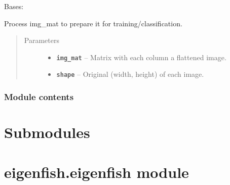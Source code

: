 \documentclass[letterpaper,10pt,english]{sphinxmanual}
\begin{document}
\begin{fulllineitems}
\label{eigenfish.process:eigenfish.process.process.Processor}
Bases: 

\begin{fulllineitems}
\label{eigenfish.process:eigenfish.process.process.Processor.process}
Process img\_mat to prepare it for training/classification.
\begin{quote}\begin{description}
\item[{Parameters}] \leavevmode\begin{itemize}
\item {} 
\textbf{\texttt{img\_mat}} -- Matrix with each column a flattened image.

\item {} 
\textbf{\texttt{shape}} -- Original (width, height) of each image.

\end{itemize}

\end{description}\end{quote}

\end{fulllineitems}


\end{fulllineitems}



\subsubsection{Module contents}
\label{eigenfish.process:module-eigenfish.process}\label{eigenfish.process:module-contents}

\section{Submodules}
\label{eigenfish:submodules}

\section{eigenfish.eigenfish module}
\label{eigenfish:eigenfish-eigenfish-module}\label{eigenfish:module-eigenfish.eigenfish}
\end{document}
